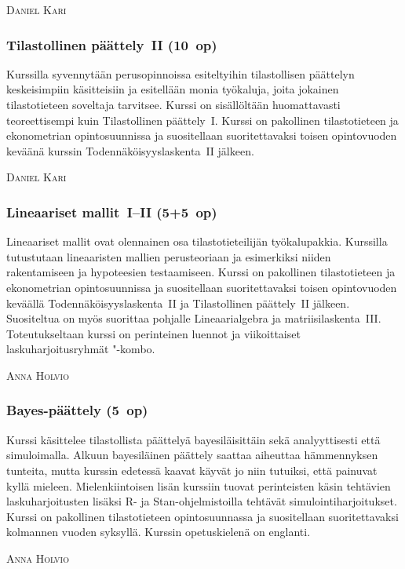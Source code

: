 \documentclass[../ala_hataile.tex]{subfiles}
\begin{document}
\vspace{0.5cm}
\noindent\textsc{Daniel Kari}
\subsubsection*{Tilastollinen päättely~II (10~op)}
Kurssilla syvennytään perusopinnoissa esiteltyihin tilastollisen päättelyn keskeisimpiin käsitteisiin ja esitellään monia työkaluja, joita jokainen tilastotieteen soveltaja tarvitsee. Kurssi on sisällöltään huomattavasti teoreettisempi kuin Tilastollinen päättely~I. Kurssi on pakollinen tilastotieteen ja ekonometrian opintosuunnissa ja suositellaan suoritettavaksi toisen opintovuoden keväänä kurssin Todennäköisyyslaskenta~II jälkeen.

\vspace{0.5cm}
\noindent\textsc{Daniel Kari}
\subsubsection*{Lineaariset mallit~I--II (5+5~op)}
Lineaariset mallit ovat olennainen osa tilastotieteilijän työkalupakkia. Kurssilla tutustutaan lineaaristen mallien perusteoriaan ja esimerkiksi niiden rakentamiseen ja hypoteesien testaamiseen. Kurssi on pakollinen tilastotieteen ja ekonometrian opintosuunnissa ja suositellaan suoritettavaksi toisen opintovuoden keväällä Todennäköisyyslaskenta~II ja Tilastollinen päättely~II jälkeen. Suositeltua on myös suorittaa pohjalle Lineaarialgebra ja matriisilaskenta~III. Toteutukseltaan kurssi on perinteinen luennot ja viikoittaiset laskuharjoitusryhmät "-kombo.

\vspace{0.5cm}
\noindent\textsc{Anna Holvio}
\subsubsection*{Bayes-päättely (5~op)}
Kurssi käsittelee tilastollista päättelyä bayesiläisittäin sekä analyyttisesti että simuloimalla. Alkuun bayesiläinen päättely saattaa aiheuttaa hämmennyksen tunteita, mutta kurssin edetessä kaavat käyvät jo niin tutuiksi, että painuvat kyllä mieleen. Mielenkiintoisen lisän kurssiin tuovat perinteisten käsin tehtävien laskuharjoitusten lisäksi R- ja Stan-ohjelmistoilla tehtävät simulointi\-harjoitukset. Kurssi on pakollinen tilastotieteen opintosuunnassa ja suositellaan suoritettavaksi kolmannen vuoden syksyllä. Kurssin opetuskielenä on englanti.

\vspace{0.5cm}
\noindent\textsc{Anna Holvio}
\end{document}
